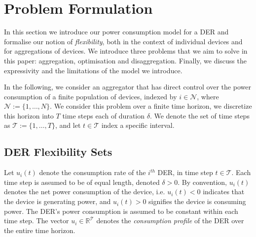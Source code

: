 \section{Problem Formulation}\label{sec:prob_form}
In this section we introduce our power consumption model for a DER and formalise our notion of \textit{flexibility}, both in the context of individual devices and for aggregations of devices.
We introduce three problems that we aim to solve in this paper: aggregation, optimisation and disaggregation. 
Finally, we discuss the expressivity and the limitations of the model we introduce.

In the following, we consider an aggregator that has direct control over the power consumption of a finite population of devices, indexed by $i \in \mathcal{N}$, where $\mathcal{N} := \{1, \ldots, N\}$. 
We consider this problem over a finite time horizon, we discretize this horizon into $T$ time steps each of duration $\delta$. We denote the set of time steps as $\mathcal{T} := \{1, \ldots, T\}$, and let $t \in \mathcal{T}$ index a specific interval. 

\subsection{DER Flexibility Sets}\label{subsect:der_model}
Let $u_i(t)$ denote the consumption rate of the $i^{th}$ DER, in time step $t \in \mathcal{T}$. Each time step is assumed to be of equal length, denoted $\delta > 0$.  By convention, $u_i(t)$ denotes the net power consumption of the device, i.e. $u_i(t) < 0$ indicates that the device is generating power, and $u_i(t) > 0$ signifies the device is consuming power. The DER's power consumption is assumed to be constant within each time step. The vector $u_i \in \mathbb{R}^{\mathcal{T}}$ denotes the \textit{consumption profile} of the DER over the entire time horizon.


